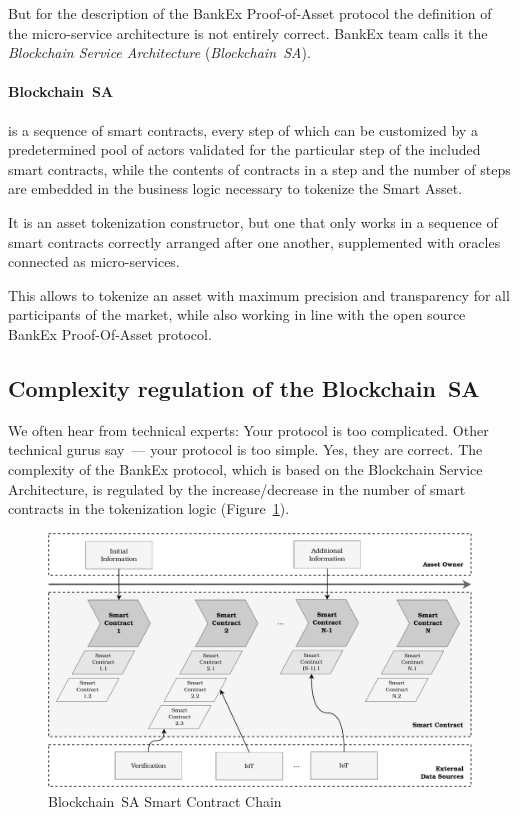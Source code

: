\documentclass{article}
\begin{document}
\begin{multicols}{2}
But for the description of the BankEx Proof-of-Asset protocol the definition of the micro-service architecture is not entirely correct. BankEx team calls it the \textit{Blockchain Service Architecture} (\textit{Blockchain~SA}).

\paragraph*{Blockchain~SA} is a sequence of smart contracts, every step of which can be customized by a predetermined pool of actors validated for the particular step of the included smart contracts, while the contents of contracts in a step and the number of steps are embedded in the business logic necessary to tokenize the Smart Asset.

It is an asset tokenization constructor, but one that only works in a sequence of smart contracts correctly arranged after one another, supplemented with oracles connected as micro-services. 

This allows to tokenize an asset with maximum precision and transparency for all participants of the market, while also working in line with the open source BankEx Proof-Of-Asset protocol. 

\subsection{Complexity regulation of the Blockchain~SA}

We often hear from technical experts: Your protocol is too complicated. Other technical gurus say~--- your protocol is too simple. Yes, they are correct. The complexity of the BankEx protocol, which is based on the Blockchain Service Architecture, is regulated by the increase/decrease in the number of smart contracts in the tokenization logic (Figure~\ref{fig:smart-asset-contract-chain}).

\begin{figure}
  \centering
  \includegraphics[width=\textwidth]{smart-asset-contract-chain.pdf}
  \caption{Blockchain~SA Smart Contract Chain}
  \label{fig:smart-asset-contract-chain}
\end{figure}


\end{multicols}
\end{document}
